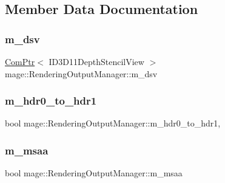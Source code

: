 \subsection{Member Data Documentation}
\hypertarget{classmage_1_1_rendering_output_manager_a3c6290fd9b186fbe56a47adb6d774ccf}{}\label{classmage_1_1_rendering_output_manager_a3c6290fd9b186fbe56a47adb6d774ccf} 
\subsubsection{\texorpdfstring{m\+\_\+dsv}{m\_dsv}}
{\footnotesize\ttfamily \hyperlink{namespacemage_ae74f374780900893caa5555d1031fd79}{Com\+Ptr}$<$ I\+D3\+D11\+Depth\+Stencil\+View $>$ mage\+::\+Rendering\+Output\+Manager\+::m\+\_\+dsv\hspace{0.3cm}{\ttfamily [private]}}

\hypertarget{classmage_1_1_rendering_output_manager_ae2164d5657239162591cdcdefa75e240}{}\label{classmage_1_1_rendering_output_manager_ae2164d5657239162591cdcdefa75e240} 
\subsubsection{\texorpdfstring{m\+\_\+hdr0\+\_\+to\+\_\+hdr1}{m\_hdr0\_to\_hdr1}}
{\footnotesize\ttfamily bool mage\+::\+Rendering\+Output\+Manager\+::m\+\_\+hdr0\+\_\+to\+\_\+hdr1\hspace{0.3cm}{\ttfamily [mutable]}, {\ttfamily [private]}}

\hypertarget{classmage_1_1_rendering_output_manager_ab28e6451a0c2eb918b63ae312018ffe1}{}\label{classmage_1_1_rendering_output_manager_ab28e6451a0c2eb918b63ae312018ffe1} 
\subsubsection{\texorpdfstring{m\+\_\+msaa}{m\_msaa}}
{\footnotesize\ttfamily bool mage\+::\+Rendering\+Output\+Manager\+::m\+\_\+msaa\hspace{0.3cm}{\ttfamily [private]}}

